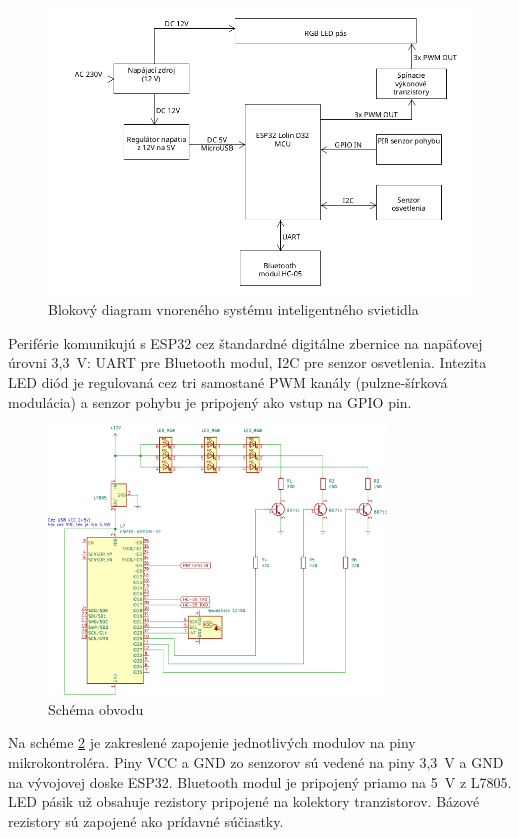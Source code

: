 \documentclass[12pt, a4paper]{article}
\begin{document}
\begin{figure}[h]
	\centering
	\includegraphics[width=\textwidth]{assets/block-diagram.png}
	\caption{Blokový diagram vnoreného systému inteligentného svietidla}
	\label{fig:block-diagram}
\end{figure}

Periférie komunikujú s ESP32 cez štandardné digitálne zbernice na napäťovej úrovni 3,3~V: UART pre Bluetooth modul, I2C pre senzor osvetlenia. Intezita LED diód je regulovaná cez tri samostané PWM kanály (pulzne-šírková modulácia) a senzor pohybu je pripojený ako vstup na GPIO pin.

\begin{figure}[h]
	\centering
	\includegraphics[width=0.8\textwidth]{assets/electrical-schematics.png}
	\caption{Schéma obvodu}
	\label{fig:electrical}
\end{figure}
Na schéme \ref{fig:electrical} je zakreslené zapojenie jednotlivých modulov na piny mikrokontroléra. Piny VCC a GND zo senzorov sú vedené na piny 3,3~V a GND na vývojovej doske ESP32. Bluetooth modul je pripojený priamo na 5~V z L7805. LED pásik už obsahuje rezistory pripojené na kolektory tranzistorov. Bázové rezistory sú zapojené ako prídavné súčiastky.
\FloatBarrier
\end{document}
